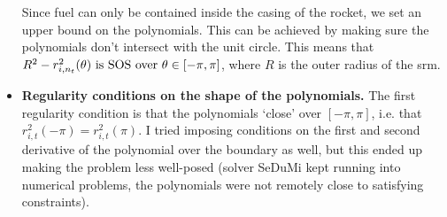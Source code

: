\begin{itemize}
        Since fuel can only be contained inside the casing of the rocket,
        we set an upper bound on the polynomials. This can be achieved by making sure
        the polynomials don't intersect with the unit circle. This means that
        $R^2 - r^2_{i,n_t}(\theta) \rm{~is~SOS~over~} \theta \in [-\pi, \pi]$, where
        $R$ is the outer radius of the \gls{srm}.
        \item \textbf{Regularity conditions on the shape of the polynomials.}
        The first regularity condition is that the polynomials `close' over $[-\pi, \pi]$, i.e.
        that $r^2_{i,t}(-\pi) = r^2_{i,t}(\pi)$.
        I tried imposing conditions on the first and second derivative of the polynomial over the boundary as well,
        but this ended up making the problem less well-posed (solver SeDuMi kept running
        into numerical problems, the polynomials were not remotely close to satisfying constraints).
    \end{itemize}

